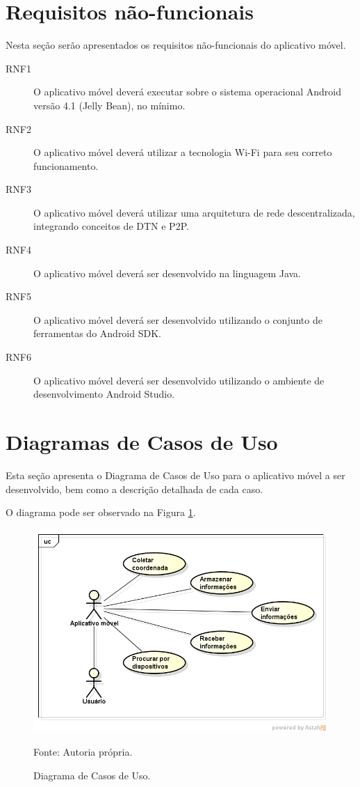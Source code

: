 \section{Requisitos não-funcionais}

Nesta seção serão apresentados os requisitos não-funcionais do aplicativo móvel.

\begin{description}
  \item[RNF1] O aplicativo móvel deverá executar sobre o sistema operacional Android versão 4.1 (Jelly Bean), no mínimo.
  \item[RNF2]  O aplicativo móvel deverá utilizar a tecnologia Wi-Fi para seu correto funcionamento.
  \item[RNF3] O aplicativo móvel deverá utilizar uma arquitetura de rede descentralizada, integrando conceitos de DTN e P2P.
  \item[RNF4] O aplicativo móvel deverá ser desenvolvido na linguagem Java.
  \item[RNF5] O aplicativo móvel deverá ser desenvolvido utilizando o conjunto de ferramentas do Android SDK.
  \item[RNF6] O aplicativo móvel deverá ser desenvolvido utilizando o ambiente de desenvolvimento Android Studio.
\end{description}

\newpage

\section{Diagramas de Casos de Uso}

Esta seção apresenta o Diagrama de Casos de Uso para o aplicativo móvel a ser desenvolvido, bem como a descrição detalhada de cada caso.

O diagrama pode ser observado na Figura \ref{fig:uc}.

\begin{figure}[h]
\begin{center}
    \includegraphics[width=1\columnwidth]{../figs/uc_tcc.png}
    \caption{Diagrama de Casos de Uso.}Fonte: Autoria própria.%
    \label{fig:uc}
\end{center}
\end{figure}
